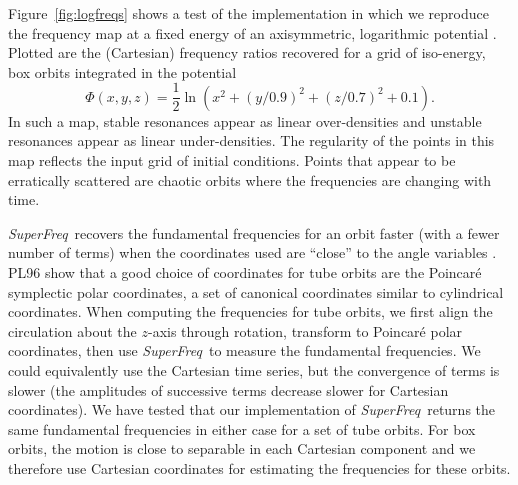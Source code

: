 \documentclass[letterpaper,12pt,preprint]{aastex}
\newcommand{\project}[1]{\textsl{#1}}
\newcommand{\superfreq}{\project{SuperFreq}}
\begin{document}
Figure~\ref{fig:logfreqs} shows a test of the implementation in which we reproduce the frequency map at a fixed energy of an axisymmetric, logarithmic potential \cite[][pg. 260, Figure~3.45]{binneytremaine}. Plotted are the (Cartesian) frequency ratios recovered for a grid of iso-energy, box orbits integrated in the potential
\begin{equation}
	\Phi(x,y,z) = \frac{1}{2}\ln\left(x^2 + (y/0.9)^2 + (z/0.7)^2 + 0.1\right). \label{eq:logpotential}
\end{equation}
In such a map, stable resonances appear as linear over-densities and unstable resonances appear as linear under-densities. The regularity of the points in this map reflects the input grid of initial conditions. Points that appear to be erratically scattered are chaotic orbits where the frequencies are changing with time.

\superfreq\ recovers the fundamental frequencies for an orbit faster (with a fewer number of terms) when the coordinates used are ``close'' to the angle variables \cite[PL96;][]{papaphilippou96}. PL96 show that a good choice of coordinates for tube orbits are the Poincar\'e symplectic polar coordinates, a set of canonical coordinates similar to cylindrical coordinates. When computing the frequencies for tube orbits, we first align the circulation about the $z$-axis through rotation, transform to Poincar\'e polar coordinates, then use \superfreq\ to measure the fundamental frequencies. We could equivalently use the Cartesian time series, but the convergence of terms is slower (the amplitudes of successive terms decrease slower for Cartesian coordinates). We have tested that our implementation of \superfreq\ returns the same fundamental frequencies in either case for a set of tube orbits. For box orbits, the motion is close to separable in each Cartesian component and we therefore use Cartesian coordinates for estimating the frequencies for these orbits. 
\end{document}
